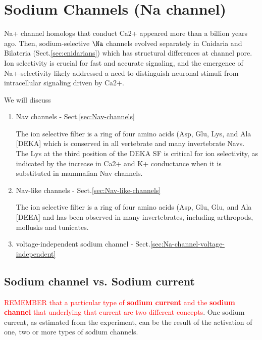 \chapter{Sodium Channels (Na channel)}
\label{chap:Na-channel}

\def\dtsz{{\text{dt}$^\text{sz}$}}

Na+ channel homologs that conduct Ca2+ appeared more than a billion years ago.
Then, sodium-selective $\Na$ channels evolved separately in Cnidaria and
Bilateria (Sect.\ref{sec:cnidarians}) which has structural differences at
channel pore. Ion selectivity is crucial for fast and accurate signaling, and
the emergence of Na+-selectivity likely addressed a need to distinguish neuronal
stimuli from intracellular signaling driven by Ca2+.

We will discuss
\begin{enumerate}
  \item Nav channels - Sect.\ref{sec:Nav-channels}
  
   The ion selective filter is a ring of four amino acids (Asp, Glu, Lys, and
   Ala [DEKA] which is conserved in all vertebrate and many invertebrate Navs.
   The Lys at the third position of the DEKA SF is critical for ion selectivity,
   as indicated by the increase in Ca2+ and K+ conductance when it is
   substituted in mammalian Nav channels.
   
  \item Nav-like channels - Sect.\ref{sec:Nav-like-channels}

   The ion selective filter is a ring of four amino acids (Asp, Glu, Glu, and
   Ala [DEEA] and has been observed in many invertebrates, including arthropods,
   mollusks and tunicates.
     
  \item voltage-independent sodium channel - Sect.\ref{sec:Na-channel-voltage-independent}
\end{enumerate}

\section{Sodium channel vs. Sodium current}

\textcolor{red}{REMEMBER that a particular type of {\bf sodium current} and the
{\bf sodium channel} that underlying that current are two different concepts}.
One sodium current, as estimated from the experiment, can be the result of the
activation of one, two or more types of sodium channels.


